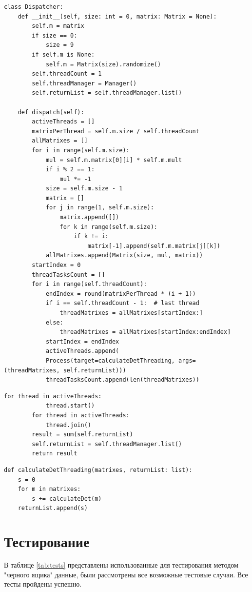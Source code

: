 \documentclass[a4paper,oneside,14pt]{extreport}
\begin{document}
\begin{lstlisting}[caption=Поток-диспетчер (часть 1)]
class Dispatcher:
	def __init__(self, size: int = 0, matrix: Matrix = None):
		self.m = matrix
		if size == 0: 
			size = 9
		if self.m is None:
			self.m = Matrix(size).randomize()
		self.threadCount = 1
		self.threadManager = Manager()
		self.returnList = self.threadManager.list()
	
	def dispatch(self):
		activeThreads = []
		matrixPerThread = self.m.size / self.threadCount
		allMatrixes = []
		for i in range(self.m.size):
			mul = self.m.matrix[0][i] * self.m.mult
			if i % 2 == 1:
				mul *= -1
			size = self.m.size - 1
			matrix = []
			for j in range(1, self.m.size):
				matrix.append([])
				for k in range(self.m.size):
					if k != i:
						matrix[-1].append(self.m.matrix[j][k])
			allMatrixes.append(Matrix(size, mul, matrix))
		startIndex = 0
		threadTasksCount = []
		for i in range(self.threadCount):
			endIndex = round(matrixPerThread * (i + 1))
			if i == self.threadCount - 1:  # last thread
				threadMatrixes = allMatrixes[startIndex:]
			else:
				threadMatrixes = allMatrixes[startIndex:endIndex]
			startIndex = endIndex
			activeThreads.append(
			Process(target=calculateDetThreading, args=(threadMatrixes, self.returnList)))
			threadTasksCount.append(len(threadMatrixes))
\end{lstlisting}
\begin{lstlisting}[caption=Поток-диспетчер (часть 2)]
		for thread in activeThreads:
			thread.start()
		for thread in activeThreads:
			thread.join()
		result = sum(self.returnList)
		self.returnList = self.threadManager.list()
		return result
\end{lstlisting}
\begin{lstlisting}[caption=Рабочий поток, label={lst:work_thread}]
def calculateDetThreading(matrixes, returnList: list):
	s = 0
	for m in matrixes:
		s += calculateDet(m)
	returnList.append(s)
\end{lstlisting}

\section{Тестирование}
В таблице \ref{tab:tests} представлены использованные для тестирования методом "черного ящика" данные, были рассмотрены все возможные тестовые случаи. Все тесты пройдены успешно.
\end{document}
